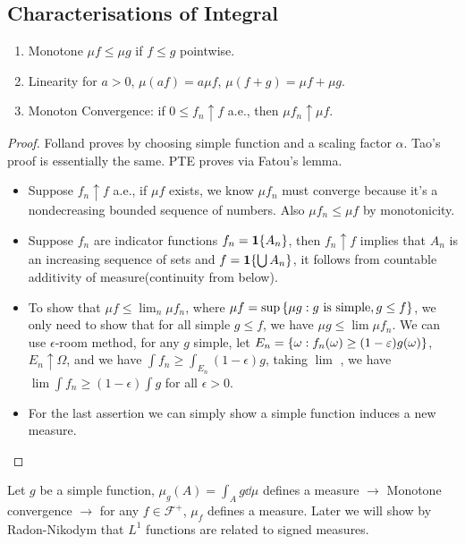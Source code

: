 \subsection{Characterisations of Integral}

\begin{thm}
    \begin{enumerate}
        \item Monotone \(\mu f \leq \mu g\) if \(f \leq g\) pointwise.
        \item Linearity for \(a > 0\), \(\mu (af) = a \mu f\), \(\mu(f + g)=  \mu f + \mu g\).
        \item Monoton Convergence: if \(0 \leq f_{n} \uparrow f\) a.e., then \(\mu f_{n} \uparrow \mu f\). 
    \end{enumerate}
\end{thm}
\begin{proof}
    Folland proves by choosing simple function and a scaling factor \(\alpha\). Tao's proof is essentially the same.
    PTE proves via Fatou's lemma. 
    \begin{itemize}
    \item
    Suppose \(f_{n}\uparrow f\) a.e., if \(\mu f\) exists, we know \(\mu f_{n}\) must converge because it's a nondecreasing bounded sequence of numbers. Also \(\mu f_{n} \leq \mu f\) by monotonicity. 
    \item Suppose \(f_{n}\) are indicator functions \(f_{n} = \mathbf{1}\{A_{n}\}\), then \(f_{n} \uparrow f\) implies that \(A_{n}\) is an increasing sequence of sets and \(f = \mathbf{1}\{\bigcup A_{n}\}\), it follows from countable additivity of measure(continuity from below). 
    \item
    To show that \(\mu f \leq \lim_{n} \mu f_{n}\), where \(\mu f = \sup \Bqty{\mu g: g \text{ is simple}, g \leq f}\), we only need to show that for all simple \(g \leq f\), we have \(\mu g \leq \lim \mu f_{n}\). We can use \(\epsilon\)-room method, for any \(g\) simple, let \(E_{n} = \Bqty{\omega: f_{n}(\omega) \geq (1 - \epsilon) g(\omega)}\), \(E_{n} \uparrow \Omega\), and we have \(\int f_{n} \geq \int_{E_{n}} (1 - \epsilon)g\), taking \(\lim\) , we have \(\lim \int f_{n} \geq (1 - \epsilon) \int g\) for all \(\epsilon> 0\). 
    \item For the last assertion we can simply show a simple function induces a new measure. 
    \end{itemize}
\end{proof}

\begin{remark}
    Let \(g\) be a simple function, \(\mu_{g}(A) = \int_{A} g \dd{\mu} \) defines a measure \(\rightarrow\) Monotone convergence \(\rightarrow\) for any \(f \in \mathcal{F}^{+}\), \(\mu_{f}\) defines a measure. Later we will show by Radon-Nikodym that \(L^{1}\) functions are related to signed measures.
\end{remark}

